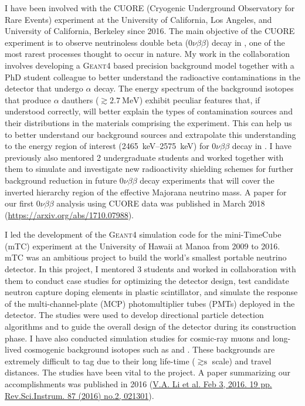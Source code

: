 \documentclass[11pt]{article} %
\begin{document}
I have been involved with the CUORE (Cryogenic Underground Observatory for Rare
Events) experiment at the University of California, Los Angeles, and University
of California, Berkeley since 2016. The main objective of the CUORE experiment
is to observe neutrinoless double beta ($0\nu\beta\beta$) decay in
, one of the most rarest processes thought to occur in nature. My
work in the collaboration involves developing a \textsc{Geant4} based precision
background model together with a PhD student colleague to better understand the
radioactive contaminations in the detector that undergo $\alpha$ decay. The
energy spectrum of the background isotopes that produce $\alpha$ dauthers
($\gtrsim \SI{2.7}{\mega\electronvolt}$) exhibit peculiar features that, if
understood correctly, will better explain the types of contamination sources
and their distributions in the materials comprising the experiment. This can
help us to better understand our background sources and extrapolate this
understanding to the energy region of interest
(\SIrange{2465}{2575}{\kilo\electronvolt}) for $0\nu\beta\beta$ decay in
. I have previously also mentored 2 undergraduate students and
worked together with them to simulate and investigate new radioactivity
shielding schemes for further background reduction in future $0\nu\beta\beta$
decay experiments that will cover the inverted hierarchy region of the
effective Majorana neutrino mass. A paper for our first $0\nu\beta\beta$
analysis using CUORE data was published in March 2018
(\href{https://arxiv.org/abs/1710.07988}{https://arxiv.org/abs/1710.07988}).

I led the development of the \textsc{Geant4} simulation code for the
mini-TimeCube (mTC) experiment at the University of Hawaii at Manoa from 2009
to 2016. mTC was an ambitious project to build the world's smallest portable
neutrino detector. In this project, I mentored 3 students and worked in
collaboration with them to conduct case studies for optimizing the detector
design, test candidate neutron capture doping elements in plastic scintillator,
and simulate the response of the multi-channel-plate (MCP) photomultiplier
tubes (PMTs) deployed in the detector. The studies were used to develop
directional particle detection algorithms and to guide the overall design of the
detector during its construction phase. I have also conducted simulation
studies for cosmic-ray muons and long-lived cosmogenic background isotopes such
as  and . These backgrounds are extremely difficult to
tag due to their long life-time ($\gtrsim \si{\second}$ scale) and travel
distances. The studies have been vital to the project. A paper summarizing our
accomplishments was published in 2016
(\href{https://arxiv.org/abs/1602.01405}{V.A. Li et al. Feb 3, 2016. 19 pp.
Rev.Sci.Instrum. 87 (2016) no.2, 021301}).
\end{document}
